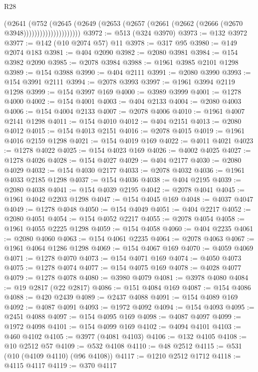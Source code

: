 \begin{lexlean}{R28}
\begin{coremodule}
                          (@2641
                            (@752
                              (@2645
                                (@2649
                                  (@2653
                                    (@2657 (@2661 (@2662 (@2666 (@2670 @3948)))))))))))))))))))))
@3972 := @513 (@324 @3970)
@3973 := @132 @3972
@3977 := @142 (@10 @2074 @57) @11
@3978 := @317 @95
@3980 := @149 @2074 @183
@3981 := @404 @2090
@3982 := @2080 @3981
@3984 := @154 @3982 @2090
@3985 := @2078 @3984
@3988 := @1961 @3985 @2101 @1298
@3989 := @154 @3988
@3990 := @404 @2111
@3991 := @2080 @3990
@3993 := @154 @3991 @2111
@3994 := @2078 @3993
@3997 := @1961 @3994 @2119 @1298
@3999 := @154 @3997 @169
@4000 := @3989 @3999
@4001 := @1278 @4000
@4002 := @154 @4001
@4003 := @404 @2133
@4004 := @2080 @4003
@4006 := @154 @4004 @2133
@4007 := @2078 @4006
@4010 := @1961 @4007 @2141 @1298
@4011 := @154 @4010
@4012 := @404 @2151
@4013 := @2080 @4012
@4015 := @154 @4013 @2151
@4016 := @2078 @4015
@4019 := @1961 @4016 @2159 @1298
@4021 := @154 @4019 @169
@4022 := @4011 @4021
@4023 := @1278 @4022
@4025 := @154 @4023 @169
@4026 := @4002 @4025
@4027 := @1278 @4026
@4028 := @154 @4027
@4029 := @404 @2177
@4030 := @2080 @4029
@4032 := @154 @4030 @2177
@4033 := @2078 @4032
@4036 := @1961 @4033 @2185 @1298
@4037 := @154 @4036
@4038 := @404 @2195
@4039 := @2080 @4038
@4041 := @154 @4039 @2195
@4042 := @2078 @4041
@4045 := @1961 @4042 @2203 @1298
@4047 := @154 @4045 @169
@4048 := @4037 @4047
@4049 := @1278 @4048
@4050 := @154 @4049
@4051 := @404 @2217
@4052 := @2080 @4051
@4054 := @154 @4052 @2217
@4055 := @2078 @4054
@4058 := @1961 @4055 @2225 @1298
@4059 := @154 @4058
@4060 := @404 @2235
@4061 := @2080 @4060
@4063 := @154 @4061 @2235
@4064 := @2078 @4063
@4067 := @1961 @4064 @1286 @1298
@4069 := @154 @4067 @169
@4070 := @4059 @4069
@4071 := @1278 @4070
@4073 := @154 @4071 @169
@4074 := @4050 @4073
@4075 := @1278 @4074
@4077 := @154 @4075 @169
@4078 := @4028 @4077
@4079 := @1278 @4078
@4080 := @3980 @4079
@4081 := @3978 @4080
@4084 := @19 @2817 (@22 @2817)
@4086 := @151 @4084 @169
@4087 := @154 @4086
@4088 := @420 @2439
@4089 := @2437 @4088
@4091 := @154 @4089 @169
@4092 := @4087 @4091
@4093 := @1972 @4092
@4094 := @154 @4093
@4095 := @2451 @4088
@4097 := @154 @4095 @169
@4098 := @4087 @4097
@4099 := @1972 @4098
@4101 := @154 @4099 @169
@4102 := @4094 @4101
@4103 := @460 @4102
@4105 := @3977 (@4081 @4103)
@4106 := @132 @4105
@4108 := @10 @2512 @57
@4109 := @532 @4108
@4110 := @48 @2512
@4115 := @531 (@10 (@4109 @4110) (@96 @4108))
@4117 := @1210 @2512 @1712
@4118 := @4115 @4117
@4119 := @370 @4117

\end{coremodule}
\end{lexlean}
